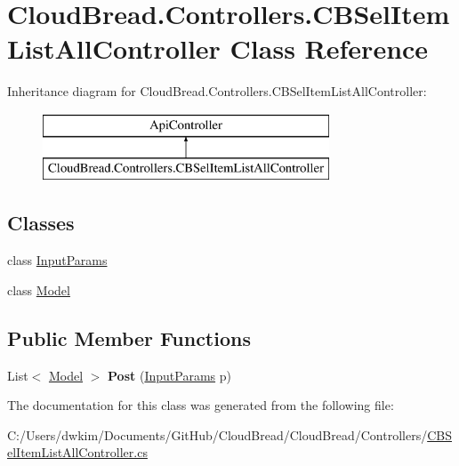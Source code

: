 \hypertarget{class_cloud_bread_1_1_controllers_1_1_c_b_sel_item_list_all_controller}{}\section{Cloud\+Bread.\+Controllers.\+C\+B\+Sel\+Item\+List\+All\+Controller Class Reference}
\label{class_cloud_bread_1_1_controllers_1_1_c_b_sel_item_list_all_controller}
Inheritance diagram for Cloud\+Bread.\+Controllers.\+C\+B\+Sel\+Item\+List\+All\+Controller\+:\begin{figure}[H]
\begin{center}
\leavevmode
\includegraphics[height=2.000000cm]{class_cloud_bread_1_1_controllers_1_1_c_b_sel_item_list_all_controller}
\end{center}
\end{figure}
\subsection*{Classes}
\begin{DoxyCompactItemize}
\item 
class \hyperlink{class_cloud_bread_1_1_controllers_1_1_c_b_sel_item_list_all_controller_1_1_input_params}{Input\+Params}
\item 
class \hyperlink{class_cloud_bread_1_1_controllers_1_1_c_b_sel_item_list_all_controller_1_1_model}{Model}
\end{DoxyCompactItemize}
\subsection*{Public Member Functions}
\begin{DoxyCompactItemize}
\item 
List$<$ \hyperlink{class_cloud_bread_1_1_controllers_1_1_c_b_sel_item_list_all_controller_1_1_model}{Model} $>$ {\bfseries Post} (\hyperlink{class_cloud_bread_1_1_controllers_1_1_c_b_sel_item_list_all_controller_1_1_input_params}{Input\+Params} p)\hypertarget{class_cloud_bread_1_1_controllers_1_1_c_b_sel_item_list_all_controller_a63d719703211c5023245d66d77ba6e5b}{}\label{class_cloud_bread_1_1_controllers_1_1_c_b_sel_item_list_all_controller_a63d719703211c5023245d66d77ba6e5b}

\end{DoxyCompactItemize}


The documentation for this class was generated from the following file\+:\begin{DoxyCompactItemize}
\item 
C\+:/\+Users/dwkim/\+Documents/\+Git\+Hub/\+Cloud\+Bread/\+Cloud\+Bread/\+Controllers/\hyperlink{_c_b_sel_item_list_all_controller_8cs}{C\+B\+Sel\+Item\+List\+All\+Controller.\+cs}\end{DoxyCompactItemize}
